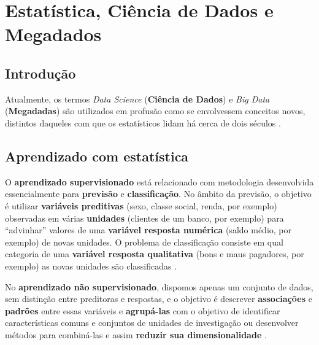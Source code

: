\documentclass[
]{latex/krantz}
\renewenvironment{quote}{\begin{VF}}{\end{VF}}
\theoremstyle{definition}
\theoremstyle{definition}
\theoremstyle{definition}
\theoremstyle{definition}
\theoremstyle{remark}
\begin{document}
\mainmatter

\hypertarget{estatuxedstica-ciuxeancia-de-dados-e-megadados}{%
\chapter{Estatística, Ciência de Dados e Megadados}\label{estatuxedstica-ciuxeancia-de-dados-e-megadados}}

\hypertarget{introduuxe7uxe3o}{%
\section{Introdução}\label{introduuxe7uxe3o}}

\begin{quote}
Atualmente, os termos \emph{Data Science} (\textbf{Ciência de Dados}) e \emph{Big Data} (\textbf{Megadadas}) são utilizados em profusão como se envolvessem conceitos novos, distintos daqueles com que os estatísticos lidam há cerca de dois séculos \citep[p.~1]{MorettinSinger2022}.
\end{quote}

\hypertarget{aprendizado-com-estatuxedstica}{%
\section{Aprendizado com estatística}\label{aprendizado-com-estatuxedstica}}

\begin{quote}
O \textbf{aprendizado supervisionado} está relacionado com metodologia desenvolvida essencialmente para \textbf{previsão} e \textbf{classificação}. No âmbito da previsão, o objetivo é utilizar \textbf{variáveis preditivas} (sexo, classe social, renda, por exemplo) observadas em várias \textbf{unidades} (clientes de um banco, por exemplo) para ``advinhar'' valores de uma \textbf{variável resposta numérica} (saldo médio, por exemplo) de novas unidades. O problema de classificação consiste em qual categoria de uma \textbf{variável resposta qualitativa} (bons e maus pagadores, por exemplo) as novas unidades são classificadas \citep[p.~3]{MorettinSinger2022}.
\end{quote}

\begin{quote}
No \textbf{aprendizado não supervisionado}, dispomos apenas um conjunto de dados, sem distinção entre preditoras e respostas, e o objetivo é descrever \textbf{associações} e \textbf{padrões} entre essas variáveis e \textbf{agrupá-las} com o objetivo de identificar características comuns e conjuntos de unidades de investigação ou desenvolver métodos para combiná-las e assim \textbf{reduzir sua dimensionalidade} \citep[p.~3]{MorettinSinger2022}.
\end{quote}
\end{document}
